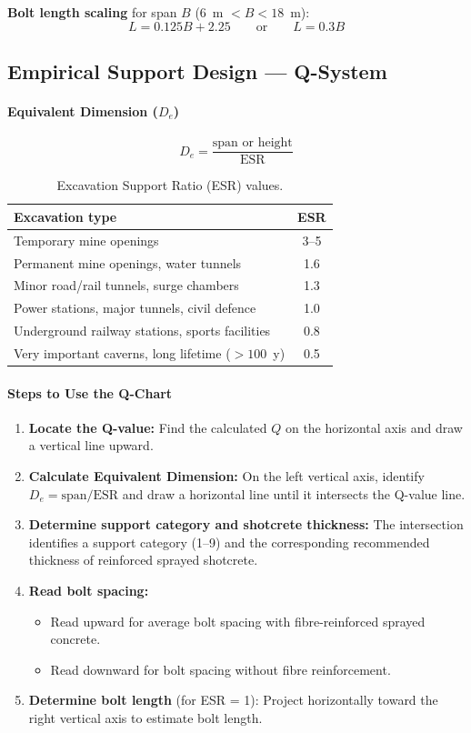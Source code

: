 \textbf{Bolt length scaling} for span $B$ (6~m $< B < 18$~m):
\[
L = 0.125B + 2.25
\qquad \text{or} \qquad
L = 0.3B
\]

\subsection{Empirical Support Design --- Q-System}

\paragraph{Equivalent Dimension ($D_e$)}
\[
D_e = \frac{\text{span or height}}{\text{ESR}}
\]

\begin{table}[ht]
\centering
\begin{tabularx}{\textwidth}{X c}
\toprule
\textbf{Excavation type} & \textbf{ESR} \\
\midrule
Temporary mine openings & 3--5 \\
Permanent mine openings, water tunnels & 1.6 \\
Minor road/rail tunnels, surge chambers & 1.3 \\
Power stations, major tunnels, civil defence & 1.0 \\
Underground railway stations, sports facilities & 0.8 \\
Very important caverns, long lifetime ($>100$~y) & 0.5 \\
\bottomrule
\end{tabularx}
\caption{Excavation Support Ratio (ESR) values.}
\end{table}

\paragraph{Steps to Use the Q-Chart}
\begin{enumerate}
 \item \textbf{Locate the Q-value:} Find the calculated $Q$ on the horizontal axis and draw a vertical line upward.
 \item \textbf{Calculate Equivalent Dimension:} On the left vertical axis, identify $D_e = \text{span}/\text{ESR}$ and draw a horizontal line until it intersects the Q-value line.
 \item \textbf{Determine support category and shotcrete thickness:} The intersection identifies a support category (1--9) and the corresponding recommended thickness of reinforced sprayed shotcrete.
 \item \textbf{Read bolt spacing:}
 \begin{itemize}
 \item Read upward for average bolt spacing with fibre-reinforced sprayed concrete.
 \item Read downward for bolt spacing without fibre reinforcement.
 \end{itemize}
 \item \textbf{Determine bolt length} (for ESR = 1): Project horizontally toward the right vertical axis to estimate bolt length.
\end{enumerate}

